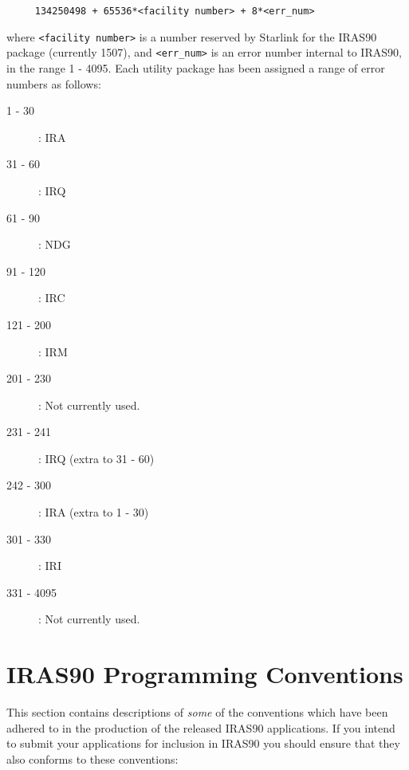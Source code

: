 \small
\begin{verbatim}
     134250498 + 65536*<facility number> + 8*<err_num>
\end{verbatim}
\normalsize

where \verb+<facility number>+ is a number reserved by Starlink for the {\small
IRAS90} package (currently 1507), and \verb+<err_num>+ is an error number
internal to IRAS90, in the range 1 - 4095. Each utility package has been
assigned a range of error numbers as follows: 

\begin{description}
\item [1 -   30] : IRA
\item [31 -   60] : IRQ
\item [61 -   90] : NDG
\item [91 -  120] : IRC
\item [121 -  200] : IRM
\item [201 -  230] : Not currently used.
\item [231 -  241] : IRQ (extra to 31 - 60)
\item [242 -  300] : IRA (extra to 1 - 30)
\item [301 -  330] : IRI
\item [331 - 4095] : Not currently used.
\end{description}

\section{IRAS90 Programming Conventions}
\label{SEC:CONV}
This section contains descriptions of {\em some} of the conventions which have
been adhered to in the production of the released {\small IRAS90} applications.
If you intend to submit your applications for inclusion in {\small IRAS90} you
should ensure that they also conforms to these conventions: 

